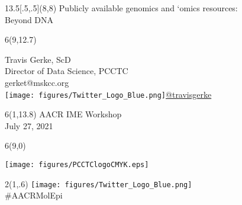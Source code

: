 \documentclass{beamer}
\begin{document}
\begin{frame}

\begin{textblock}{13.5}[.5,.5](8,8)
\centering
\normalsize{Publicly available genomics and `omics resources:\\
Beyond DNA}
\end{textblock}

\begin{textblock}{6}(9,12.7)
\begin{flushright}
\scriptsize{Travis Gerke, ScD}\\
\tiny{Director of Data Science, PCCTC}\\
\tiny{gerket@mskcc.org}\\
\texttt{[image: figures/Twitter\_Logo\_Blue.png]}\tiny{\href{https://twitter.com/travisgerke}{@travisgerke}}\\
\end{flushright}
\end{textblock}

\begin{textblock}{6}(1,13.8)
\tiny{AACR IME Workshop\\July 27, 2021\\}
\end{textblock}

\begin{textblock}{6}(9,0)
\begin{flushright}
\texttt{[image: figures/PCCTClogoCMYK.eps]}
\end{flushright}
\end{textblock}

\begin{textblock}{2}(1,.6)
\centering
\texttt{[image: figures/Twitter\_Logo\_Blue.png]}\\
\scriptsize{\#AACRMolEpi}
\end{textblock}

\end{frame}
\end{document}
